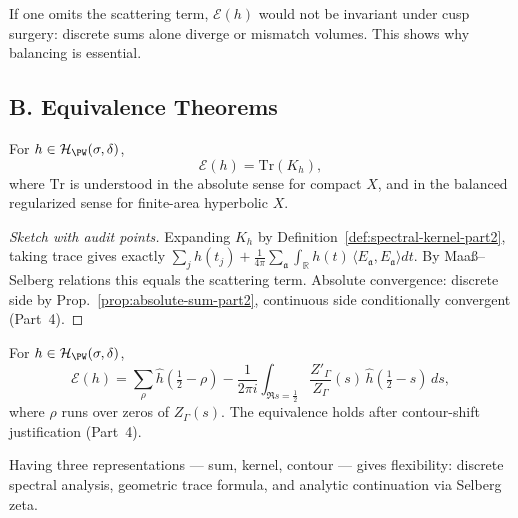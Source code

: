 \begin{counterexample}
If one omits the scattering term, $\mathcal E(h)$ would not be invariant under cusp surgery: discrete sums alone diverge or mismatch volumes. This shows why balancing is essential.
\end{counterexample}


\subsection*{B. Equivalence Theorems}
\label{subsec:equiv-theorems-part3}

\begin{theorem}
\label{thm:equiv-spectral-kernel-part3}
For $h\in\mathcal H_{\PW}(\sigma,\delta)$,
\[
  \mathcal E(h) = \mathrm{Tr}(K_h),
\]
where $\mathrm{Tr}$ is understood in the absolute sense for compact $X$, and in the balanced regularized sense for finite-area hyperbolic $X$.
\end{theorem}

\begin{proof}[Sketch with audit points]
Expanding $K_h$ by Definition~\ref{def:spectral-kernel-part2}, taking trace gives exactly $\sum_j h(t_j)+\frac{1}{4\pi}\sum_{\mathfrak a}\int_{\mathbb R} h(t)\,\langle E_{\mathfrak a},E_{\mathfrak a}\rangle dt$. By Maaß–Selberg relations this equals the scattering term. Absolute convergence: discrete side by Prop.~\ref{prop:absolute-sum-part2}, continuous side conditionally convergent (Part~4).
\end{proof}

\begin{theorem}
\label{thm:equiv-contour-part3}
For $h\in\mathcal H_{\PW}(\sigma,\delta)$,
\[
  \mathcal E(h) = \sum_{\rho}\hat h\!\left(\tfrac12-\rho\right) - \frac{1}{2\pi i}\int_{\Re s=\frac12} \frac{Z'_\Gamma}{Z_\Gamma}(s)\,\hat h\!\left(\tfrac12-s\right)\,ds,
\]
where $\rho$ runs over zeros of $Z_\Gamma(s)$. The equivalence holds after contour-shift justification (Part~4).
\end{theorem}

\begin{remark}
Having three representations — sum, kernel, contour — gives flexibility: discrete spectral analysis, geometric trace formula, and analytic continuation via Selberg zeta.
\end{remark}

